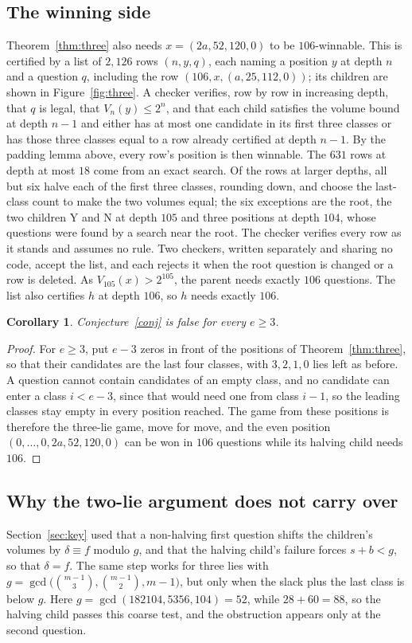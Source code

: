 \documentclass[11pt]{amsart}
\newtheorem{cor}[thm]{Corollary}
\theoremstyle{definition}
\newcommand{\Y}{\mathrm{Y}}
\newcommand{\N}{\mathrm{N}}
\begin{document}
\subsection*{The winning side} Theorem~\ref{thm:three} also needs $x=(2a,52,120,0)$ to be $106$-winnable. This is
certified by a list of $2{,}126$ rows $(n,y,q)$, each naming a position $y$ at depth $n$ and a question $q$, including
the row $(106,x,(a,25,112,0))$; its children are shown in Figure~\ref{fig:three}. A checker verifies, row by row
in increasing depth, that $q$ is legal, that $V_n(y)\le2^n$, and that each child satisfies the volume bound at depth
$n-1$ and either has at most one candidate in its first three classes or has those three classes equal to a row
already certified at depth $n-1$. By the padding lemma above, every row's position is then winnable. The $631$ rows at
depth at most $18$ come from an exact search. Of the rows at larger depths, all but six halve each of the first three
classes, rounding down, and choose the last-class count to make the two volumes equal; the six exceptions are the
root, the two children $\Y$ and $\N$ at depth $105$ and three positions at depth $104$, whose questions were found by
a search near the root. The checker verifies every row as it stands and assumes no rule. Two checkers, written separately and sharing no code, accept the list, and each rejects it
when the root question is changed or a row is deleted. As $V_{105}(x)>2^{105}$, the parent needs exactly $106$
questions. The list also certifies $h$ at depth $106$, so $h$ needs exactly $106$.

\begin{cor}\label{cor:all}
Conjecture~\ref{conj} is false for every $e\ge3$.
\end{cor}

\begin{proof}
For $e\ge3$, put $e-3$ zeros in front of the positions of Theorem~\ref{thm:three}, so that their candidates are the
last four classes, with $3,2,1,0$ lies left as before. A question cannot contain candidates of an empty class, and no
candidate can enter a class $i<e-3$, since that would need one from class $i-1$, so the leading classes stay empty
in every position reached. The game from these positions is therefore the three-lie game, move for move, and the
even position $(0,\dots,0,2a,52,120,0)$ can be won in $106$ questions while its halving child needs $106$.
\end{proof}

\subsection*{Why the two-lie argument does not carry over} Section~\ref{sec:key} used that a non-halving first
question shifts the children's volumes by $\delta\equiv f$ modulo $g$, and that the halving child's failure forces
$s+b<g$, so that $\delta=f$. The same step works for three lies with $g=\gcd\bigl(\binom{m-1}3,\binom{m-1}2,m-1\bigr)$,
but only when the slack plus the last class is below $g$. Here $g=\gcd(182104,5356,104)=52$, while $28+60=88$, so the
halving child passes this coarse test, and the obstruction appears only at the second question.
\end{document}
